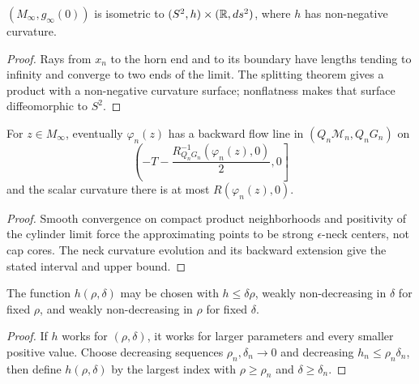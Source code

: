 \begin{claim}
\label{claim:limit-splits-as-cylinder}
$(M_\infty,g_\infty(0))$ is isometric to $(S^2,h)\times(\mathbb{R},ds^2)$, where
$h$ has non-negative curvature.
\end{claim}
\begin{proof}\sketch Rays from $x_n$ to the horn
end and to its boundary have lengths tending to infinity and converge to two
ends of the limit. The splitting theorem gives a product with a non-negative
curvature surface; nonflatness makes that surface diffeomorphic to $S^2$.\end{proof}

\begin{claim}
\label{claim:backward-flow-line-curvature-bound}
For $z\in M_\infty$, eventually $\varphi_n(z)$ has a backward flow line in
$(Q_n{\mathcal M}_n,Q_nG_n)$ on
$$\left(-T-\frac{R_{Q_nG_n}^{-1}(\varphi_n(z),0)}2,0\right]$$
and the scalar curvature there is at most $R(\varphi_n(z),0)$.
\end{claim}
\begin{proof}\sketch Smooth convergence on compact
product neighborhoods and positivity of the cylinder limit force the
approximating points to be strong $\epsilon$-neck centers, not cap cores.
The neck curvature evolution and its backward extension give the stated
interval and upper bound.\end{proof}

\begin{corollary}
\label{cor:monotone-h-function}\label{hmonotone}

The function $h(\rho,\delta)$ may be chosen with $h\le\delta\rho$, weakly
non-decreasing in $\delta$ for fixed $\rho$, and weakly non-decreasing in
$\rho$ for fixed $\delta$.
\end{corollary}
\begin{proof}\sketch If $h$ works for
$(\rho,\delta)$, it works for larger parameters and every smaller positive
value. Choose decreasing sequences $\rho_n,\delta_n\to0$ and decreasing
$h_n\le\rho_n\delta_n$, then define $h(\rho,\delta)$ by the largest index
with $\rho\ge\rho_n$ and $\delta\ge\delta_n$.\end{proof}
